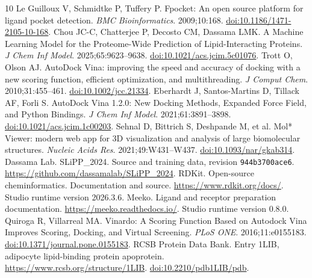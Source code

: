 \documentclass[10pt,a4paper]{article}
\begin{document}
\newpage
\begin{thebibliography}{10}
\small\setlength{\itemsep}{3pt}
 Le Guilloux V, Schmidtke P, Tuffery P. Fpocket: An open source platform for ligand pocket detection. \emph{BMC Bioinformatics}. 2009;10:168. \href{https://doi.org/10.1186/1471-2105-10-168}{doi:10.1186/1471-2105-10-168}.
 Chou JC-C, Chatterjee P, Decosto CM, Dassama LMK. A Machine Learning Model for the Proteome-Wide Prediction of Lipid-Interacting Proteins. \emph{J Chem Inf Model}. 2025;65:9623--9638. \href{https://doi.org/10.1021/acs.jcim.5c01076}{doi:10.1021/acs.jcim.5c01076}.
 Trott O, Olson AJ. AutoDock Vina: improving the speed and accuracy of docking with a new scoring function, efficient optimization, and multithreading. \emph{J Comput Chem}. 2010;31:455--461. \href{https://doi.org/10.1002/jcc.21334}{doi:10.1002/jcc.21334}.
 Eberhardt J, Santos-Martins D, Tillack AF, Forli S. AutoDock Vina 1.2.0: New Docking Methods, Expanded Force Field, and Python Bindings. \emph{J Chem Inf Model}. 2021;61:3891--3898. \href{https://doi.org/10.1021/acs.jcim.1c00203}{doi:10.1021/acs.jcim.1c00203}.
 Sehnal D, Bittrich S, Deshpande M, et al. Mol* Viewer: modern web app for 3D visualization and analysis of large biomolecular structures. \emph{Nucleic Acids Res}. 2021;49:W431--W437. \href{https://doi.org/10.1093/nar/gkab314}{doi:10.1093/nar/gkab314}.
 Dassama Lab. SLiPP\_2024. Source and training data, revision \texttt{944b3700ace6}. \url{https://github.com/dassamalab/SLiPP_2024}.
 RDKit. Open-source cheminformatics. Documentation and source. \url{https://www.rdkit.org/docs/}. Studio runtime version 2026.3.6.
 Meeko. Ligand and receptor preparation documentation. \url{https://meeko.readthedocs.io/}. Studio runtime version 0.8.0.
 Quiroga R, Villarreal MA. Vinardo: A Scoring Function Based on Autodock Vina Improves Scoring, Docking, and Virtual Screening. \emph{PLoS ONE}. 2016;11:e0155183. \href{https://doi.org/10.1371/journal.pone.0155183}{doi:10.1371/journal.pone.0155183}.
 RCSB Protein Data Bank. Entry 1LIB, adipocyte lipid-binding protein apoprotein. \url{https://www.rcsb.org/structure/1LIB}. \href{https://doi.org/10.2210/pdb1LIB/pdb}{doi:10.2210/pdb1LIB/pdb}.
\end{thebibliography}

\end{document}
